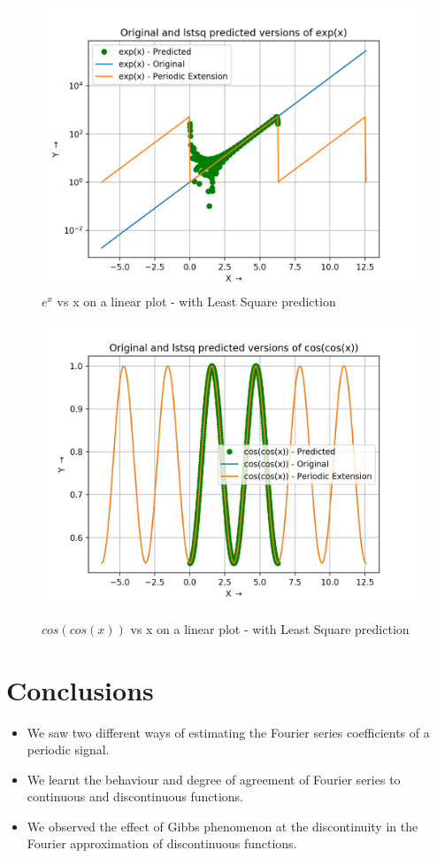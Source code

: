 \documentclass[11pt, a4paper]{article}
\begin{document}
\begin{figure}[H]
   	\centering
   	\includegraphics[scale=0.5]{expf.png}
   	\caption{$e^{x}$ vs x on a linear plot - with Least Square prediction}

   	\label{fig:expf}
\end{figure}
\begin{figure}[H]
   	\centering
   	\includegraphics[scale=0.5]{cosf.png}
   	\label{fig:cosf}
   	\caption{$cos(cos(x))$ vs x on a linear plot - with Least Square prediction}

\end{figure}

\section{Conclusions}
\begin{itemize}
\item We saw two different ways of estimating the Fourier series coefficients of a periodic signal.
\item We learnt the behaviour and degree of agreement of Fourier series to continuous and discontinuous functions.
\item We observed the effect of Gibbs phenomenon at the discontinuity in the Fourier approximation of discontinuous functions.
\end{itemize}
\end{document}
